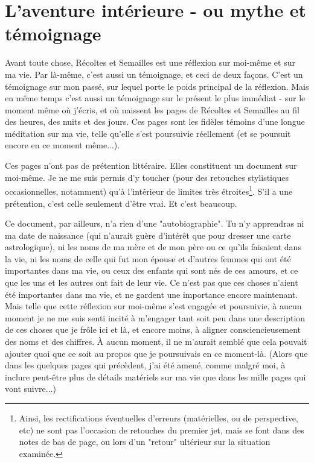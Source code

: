 \section{L'aventure intérieure - ou mythe et témoignage}

Avant toute chose, Récoltes et Semailles est une réflexion sur moi-même et sur ma vie. Par là-même, c'est aussi un témoignage, et ceci de deux façons. C'est un témoignage sur mon passé, sur lequel porte le poids principal de la réflexion. Mais en même temps c'est aussi un témoignage sur le présent le plus immédiat - sur le moment même où j'écris, et où naissent les pages de Récoltes et Semailles au fil des heures, des nuits et des jours. Ces pages sont les fidèles témoins d'une longue méditation sur ma vie, telle qu'elle s'est poursuivie réellement (et se poursuit encore en ce moment même...).

Ces pages n'ont pas de prétention littéraire. Elles constituent un document sur moi-même. Je ne me suis permis d'y toucher (pour des retouches stylistiques occasionnelles, notamment) qu'à l'intérieur de limites très étroites\footnote{Ainsi, les rectifications éventuelles d'erreurs (matérielles, ou de perspective, etc) ne sont pas l'occasion de retouches du premier jet, mais se font dans des notes de bas de page, ou lors d'un "retour" ultérieur sur la situation examinée.}. S'il a une prétention, c'est celle seulement d'être vrai. Et c'est beaucoup.

Ce document, par ailleurs, n'a rien d'une "autobiographie". Tu n'y apprendras ni ma date de naissance (qui n'aurait guère d'intérêt que pour dresser une carte astrologique), ni les noms de ma mère et de mon père ou ce qu'ils faisaient dans la vie, ni les noms de celle qui fut mon épouse et d'autres femmes qui ont été importantes dans ma vie, ou ceux des enfants qui sont nés de ces amours, et ce que les uns et les autres ont fait de leur vie. Ce n'est pas que ces choses n'aient été importantes dans ma vie, et ne gardent une importance encore maintenant. Mais telle que cette réflexion sur moi-même s'est engagée et poursuivie, à aucun moment je ne me suis senti incité à m'engager tant soit peu dans une description de ces choses que je frôle ici et là, et encore moins, à aligner consciencieusement des noms et des chiffres. À aucun moment, il ne m'aurait semblé que cela pouvait ajouter quoi que ce soit au propos que je poursuivais en ce moment-là. (Alors que dans les quelques pages qui précèdent, j'ai été amené, comme malgré moi, à inclure peut-être plus de détails matériels sur ma vie que dans les mille pages qui vont suivre...)

